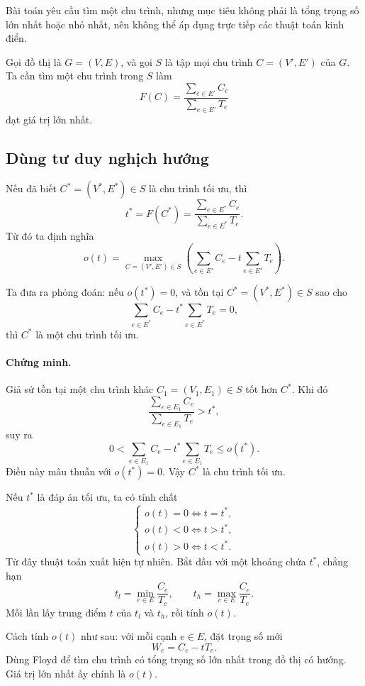 \documentclass[11pt]{article}
\begin{document}
Bài toán yêu cầu tìm một chu trình, nhưng mục tiêu không phải là tổng trọng
số lớn nhất hoặc nhỏ nhất, nên không thể áp dụng trực tiếp các thuật toán
kinh điển.

Gọi đồ thị là $G=(V,E)$, và gọi $S$ là tập mọi chu trình
$C=(V',E')$ của $G$. Ta cần tìm một chu trình trong $S$ làm
\[
  F(C)=
  \frac{\displaystyle\sum_{e\in E'} C_e}
       {\displaystyle\sum_{e\in E'} T_e}
\]
đạt giá trị lớn nhất.

\subsection{Dùng tư duy nghịch hướng}

Nếu đã biết $C^*=(V^*,E^*)\in S$ là chu trình tối ưu, thì
\[
  t^* = F(C^*) =
  \frac{\displaystyle\sum_{e\in E^*} C_e}
       {\displaystyle\sum_{e\in E^*} T_e}.
\]
Từ đó ta định nghĩa
\[
  o(t)=\max_{C=(V',E')\in S}
  \left(\sum_{e\in E'} C_e - t\sum_{e\in E'} T_e\right).
\]

Ta đưa ra phỏng đoán: nếu $o(t^*)=0$, và tồn tại
$C^*=(V^*,E^*)\in S$ sao cho
\[
  \sum_{e\in E^*} C_e - t^*\sum_{e\in E^*} T_e=0,
\]
thì $C^*$ là một chu trình tối ưu.

\paragraph{Chứng minh.}
Giả sử tồn tại một chu trình khác $C_1=(V_1,E_1)\in S$ tốt hơn $C^*$. Khi đó
\[
  \frac{\displaystyle\sum_{e\in E_1} C_e}
       {\displaystyle\sum_{e\in E_1} T_e}>t^*,
\]
suy ra
\[
  0<
  \sum_{e\in E_1} C_e - t^*\sum_{e\in E_1} T_e
  \le o(t^*).
\]
Điều này mâu thuẫn với $o(t^*)=0$. Vậy $C^*$ là chu trình tối ưu.

Nếu $t^*$ là đáp án tối ưu, ta có tính chất
\[
\begin{cases}
  o(t)=0 \Longleftrightarrow t=t^*,\\
  o(t)<0 \Longleftrightarrow t>t^*,\\
  o(t)>0 \Longleftrightarrow t<t^*.
\end{cases}
\tag{1}
\]
Từ đây thuật toán xuất hiện tự nhiên. Bắt đầu với một khoảng chứa $t^*$, chẳng
hạn
\[
  t_l=\min_{e\in E}\frac{C_e}{T_e},\qquad
  t_h=\max_{e\in E}\frac{C_e}{T_e}.
\]
Mỗi lần lấy trung điểm $t$ của $t_l$ và $t_h$, rồi tính $o(t)$.

Cách tính $o(t)$ như sau: với mỗi cạnh $e\in E$, đặt trọng số mới
\[
  W_e=C_e-tT_e.
\]
Dùng Floyd để tìm chu trình có tổng trọng số lớn nhất trong đồ thị có hướng.
Giá trị lớn nhất ấy chính là $o(t)$.
\end{document}
